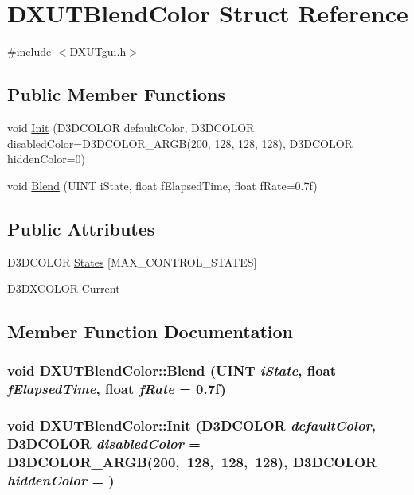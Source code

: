 \hypertarget{struct_d_x_u_t_blend_color}{
\section{DXUTBlendColor Struct Reference}
\label{struct_d_x_u_t_blend_color}
}


{\ttfamily \#include $<$DXUTgui.h$>$}\subsection*{Public Member Functions}
\begin{DoxyCompactItemize}
\item 
void \hyperlink{struct_d_x_u_t_blend_color_a051081b1395785a67eb7c42322250bfb}{Init} (D3DCOLOR defaultColor, D3DCOLOR disabledColor=D3DCOLOR\_\-ARGB(200, 128, 128, 128), D3DCOLOR hiddenColor=0)
\item 
void \hyperlink{struct_d_x_u_t_blend_color_afc4c08815d8727cca9b4995cbbb834d6}{Blend} (UINT iState, float fElapsedTime, float fRate=0.7f)
\end{DoxyCompactItemize}
\subsection*{Public Attributes}
\begin{DoxyCompactItemize}
\item 
D3DCOLOR \hyperlink{struct_d_x_u_t_blend_color_a460adbd94a1a6d14215e5f674fe4ceb3}{States} \mbox{[}MAX\_\-CONTROL\_\-STATES\mbox{]}
\item 
D3DXCOLOR \hyperlink{struct_d_x_u_t_blend_color_a66f7c28adcd07a58903d5637cc591ec1}{Current}
\end{DoxyCompactItemize}


\subsection{Member Function Documentation}
\hypertarget{struct_d_x_u_t_blend_color_afc4c08815d8727cca9b4995cbbb834d6}{
\subsubsection[{Blend}]{\setlength{\rightskip}{0pt plus 5cm}void DXUTBlendColor::Blend (UINT {\em iState}, \/  float {\em fElapsedTime}, \/  float {\em fRate} = {\ttfamily 0.7f})}}
\label{struct_d_x_u_t_blend_color_afc4c08815d8727cca9b4995cbbb834d6}
\hypertarget{struct_d_x_u_t_blend_color_a051081b1395785a67eb7c42322250bfb}{
\subsubsection[{Init}]{\setlength{\rightskip}{0pt plus 5cm}void DXUTBlendColor::Init (D3DCOLOR {\em defaultColor}, \/  D3DCOLOR {\em disabledColor} = {\ttfamily D3DCOLOR\_\-ARGB(200,~128,~128,~128)}, \/  D3DCOLOR {\em hiddenColor} = {})}}
\label{struct_d_x_u_t_blend_color_a051081b1395785a67eb7c42322250bfb}


